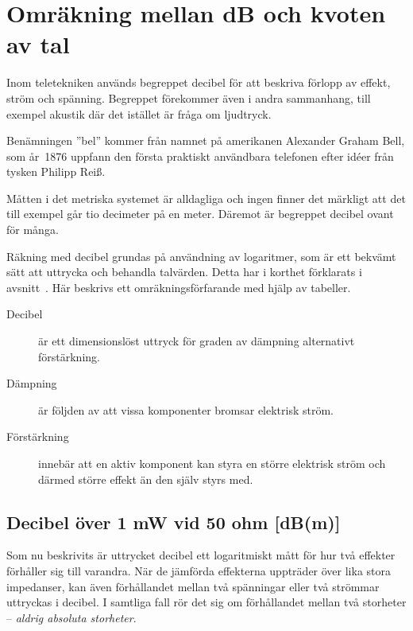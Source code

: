 \chapter{Omräkning mellan dB och kvoten av tal}
\label{ch:decibel2}

\noindent
Inom teletekniken används begreppet decibel för att beskriva förlopp
av effekt, ström och spänning.
Begreppet förekommer även i andra sammanhang, till exempel akustik där det
istället är fråga om ljudtryck.

\begin{historiabox}
Benämningen ''bel'' kommer från namnet på amerikanen Alexander Graham
Bell, som år~1876 uppfann den första praktiskt användbara telefonen
efter idéer från tysken Philipp Reiß.
\end{historiabox}

Måtten i det metriska systemet är alldagliga och ingen finner det märkligt att
det till exempel går tio decimeter på en meter.
Däremot är begreppet decibel ovant för många.

Räkning med decibel grundas på användning av logaritmer, som är ett
bekvämt sätt att uttrycka och behandla talvärden.
Detta har i korthet förklarats i avsnitt~.
Här beskrivs ett omräkningsförfarande med hjälp av tabeller.

\begin{description}
\item[Decibel] är ett dimensionslöst uttryck för graden av dämpning
  alternativt förstärkning.

\item[Dämpning] är följden av att vissa komponenter bromsar elektrisk
  ström.

\item[Förstärkning] innebär att en aktiv komponent kan styra en större
  elektrisk ström och därmed större effekt än den själv styrs med.
\end{description}

\section{Decibel över 1 mW vid 50 ohm [dB(m)]}

Som nu beskrivits är uttrycket decibel ett logaritmiskt mått för hur två
effekter förhåller sig till varandra.
När de jämförda effekterna uppträder över lika stora impedanser, kan även
förhållandet mellan två spänningar eller två strömmar uttryckas i decibel.
I samtliga fall rör det sig om förhållandet mellan två storheter --
\emph{aldrig absoluta storheter}.

